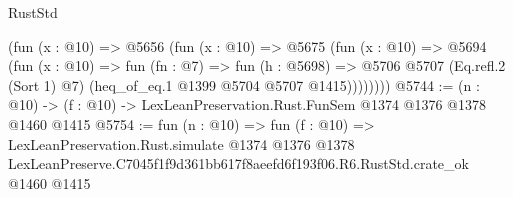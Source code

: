 \begin{lexlean}{RustStd}
\begin{coremodule}
          (fun (x : @10) =>
          @5656
            (fun (x : @10) =>
            @5675
              (fun (x : @10) =>
              @5694
                (fun (x : @10) =>
                fun (fn : @7) =>
                fun (h : @5698) =>
                @5706 @5707 (Eq.refl.{2} (Sort 1) @7) (heq_of_eq.{1} @1399 @5704 @5707 @1415))))))))
@5744 := (n : @10) -> (f : @10) -> LexLeanPreservation.Rust.FunSem @1374 @1376 @1378 @1460 @1415
@5754 := fun (n : @10) =>
  fun (f : @10) =>
  LexLeanPreservation.Rust.simulate
    @1374
    @1376
    @1378
    LexLeanPreserve.C7045f1f9d361bb617f8aeefd6f193f06.R6.RustStd.crate_ok
    @1460
    @1415
\end{coremodule}
\end{lexlean}
